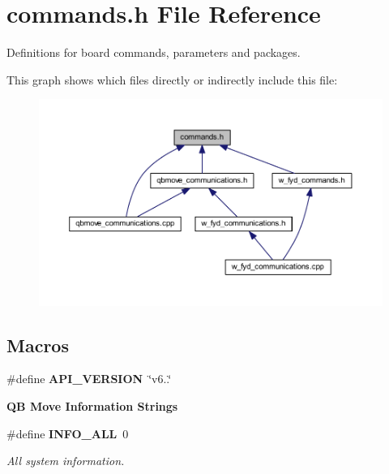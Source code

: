 \section{commands.\+h File Reference}
\label{commands_8h}


Definitions for board commands, parameters and packages.  


This graph shows which files directly or indirectly include this file\+:
\nopagebreak
\begin{figure}[H]
\begin{center}
\leavevmode
\includegraphics[width=350pt]{commands_8h__dep__incl}
\end{center}
\end{figure}
\subsection*{Macros}
\begin{DoxyCompactItemize}
\item 
\mbox{\label{commands_8h_ad97188edfdd667de971027b35330fa41}} 
\#define {\bfseries A\+P\+I\+\_\+\+V\+E\+R\+S\+I\+ON}~\char`\"{}v6..\char`\"{}
\end{DoxyCompactItemize}
\begin{Indent}\textbf{ QB Move Information Strings}\par
\begin{DoxyCompactItemize}
\item 
\mbox{\label{commands_8h_a2ba44fc5b8a316bd307d0baa9ab629ef}} 
\#define \textbf{ I\+N\+F\+O\+\_\+\+A\+LL}~0
\begin{DoxyCompactList}\small\item\em All system information. \end{DoxyCompactList}\end{DoxyCompactItemize}
\end{Indent}
